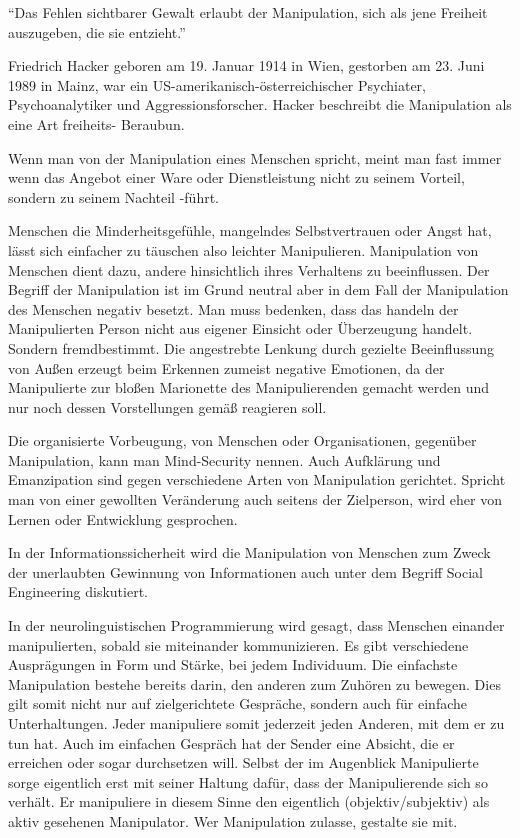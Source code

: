 \enquote{Das Fehlen sichtbarer Gewalt erlaubt der Manipulation, sich als jene Freiheit auszugeben,
die sie entzieht.}

Friedrich Hacker geboren am 19. Januar 1914 in Wien, gestorben am 23. Juni 1989 in Mainz, war ein
US-amerikanisch-österreichischer Psychiater, Psychoanalytiker und Aggressionsforscher. Hacker
beschreibt die Manipulation als eine Art freiheits- Beraubun.

\bigskip
Wenn man von der Manipulation eines Menschen spricht, meint man fast immer wenn das Angebot einer
Ware oder Dienstleistung nicht zu seinem Vorteil, sondern zu seinem Nachteil -führt.

Menschen die Minderheitsgefühle, mangelndes Selbstvertrauen oder Angst hat, lässt sich einfacher zu
täuschen  also leichter Manipulieren. Manipulation von Menschen dient dazu, andere hinsichtlich ihres
Verhaltens zu beeinflussen. Der Begriff der Manipulation ist im Grund neutral aber in dem Fall der
Manipulation des Menschen negativ besetzt. Man muss bedenken, dass das handeln der Manipulierten
Person nicht aus eigener Einsicht oder Überzeugung handelt. Sondern fremdbestimmt. Die angestrebte
Lenkung durch gezielte Beeinflussung von Außen erzeugt beim Erkennen zumeist negative Emotionen, da
der Manipulierte zur bloßen Marionette des Manipulierenden gemacht werden und nur noch dessen
Vorstellungen gemäß reagieren soll.

Die organisierte Vorbeugung, von Menschen oder Organisationen, gegenüber Manipulation, kann man
Mind-Security nennen. Auch Aufklärung und Emanzipation sind gegen verschiedene Arten von Manipulation
gerichtet. Spricht man von einer gewollten Veränderung auch seitens der Zielperson, wird eher von
Lernen oder Entwicklung gesprochen.

In der Informationssicherheit wird die Manipulation von Menschen zum Zweck der unerlaubten Gewinnung
von Informationen auch unter dem Begriff Social Engineering diskutiert.

In der neurolinguistischen Programmierung wird gesagt, dass Menschen einander manipulierten, sobald
sie miteinander kommunizieren. Es gibt verschiedene Ausprägungen in Form und Stärke, bei jedem
Individuum. Die einfachste Manipulation bestehe bereits darin, den anderen zum Zuhören zu bewegen.
Dies gilt somit nicht nur auf zielgerichtete Gespräche, sondern auch für einfache Unterhaltungen.
Jeder manipuliere somit jederzeit jeden Anderen, mit dem er zu tun hat. Auch im einfachen Gespräch
hat der Sender eine Absicht, die er erreichen oder sogar durchsetzen will. Selbst der im Augenblick
Manipulierte sorge eigentlich erst mit seiner Haltung dafür, dass der Manipulierende sich so verhält.
Er manipuliere in diesem Sinne den eigentlich (objektiv/subjektiv) als aktiv gesehenen Manipulator.
Wer Manipulation zulasse, gestalte sie mit.


